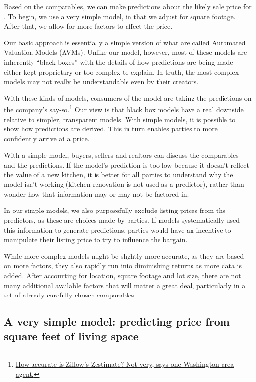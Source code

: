 \documentclass[
12pt, %
letterpaper, %
oneside, %
headinclude,footinclude, %
BCOR5mm, %
]{scrartcl}
\begin{document}
Based on the comparables, we can make predictions about the likely sale price for \PropertyName{}. 
To begin, we use a very simple model, in that we adjust for square footage.
After that, we allow for more factors to affect the price.

Our basic approach is essentially a simple version of what are called Automated Valuation Models (AVMs).
Unlike our model, however, most of these models are inherently ``black boxes'' with the details of how predictions are being made either kept proprietary or too complex to explain.
In truth, the most complex models may not really be understandable even by their creators. 

With these kinds of models, consumers of the model are taking the predictions on the company's say-so.\footnote{\href{https://www.washingtonpost.com/news/where-we-live/wp/2014/06/10/how-accurate-is-zillows-zestimate-not-very-says-one-washington-area-agent/?noredirect=on&utm_term=.e3453c7b3677}{How accurate is Zillow's Zestimate? Not very, says one Washington-area agent.}
}
Our view is that black box models have a real downside relative to simpler, transparent models.
With simple models, it is possible to show how predictions are derived.
This in turn enables parties to more confidently arrive at a price.

With a simple model, buyers, sellers and realtors can discuss the comparables and the predictions.
If the model's prediction is too low because it doesn't reflect the value of a new kitchen, it is better for all parties to understand why the model isn't working (kitchen renovation is not used as a predictor), rather than wonder how that information may or may not be factored in.

In our simple models, we also purposefully exclude listing prices from the predictors, as these are choices made by parties.
If models systematically used this information to generate predictions, parties would have an incentive to manipulate their listing price to try to influence the bargain. 

While more complex models might be slightly more accurate, as they are based on more factors, they also rapidly run into diminishing returns as more data is added.
After accounting for location, square footage and lot size, there are not many additional available factors that will matter a great deal, particularly in a set of already carefully chosen comparables.

\subsection{A very simple model: predicting price from square feet of living space}
\end{document}
